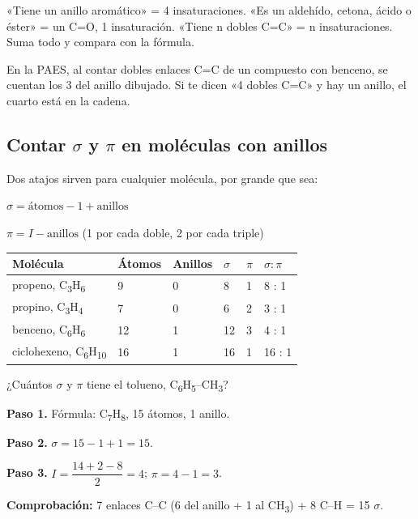 \begin{clave} «Tiene un anillo aromático» = 4 insaturaciones. «Es un aldehído, cetona, ácido o éster» = un C=O, 1 insaturación. «Tiene n dobles C=C» = n insaturaciones. Suma todo y compara con la fórmula.\end{clave}
 
\begin{ojo} En la PAES, al contar dobles enlaces C=C de un compuesto con benceno, se cuentan los 3 del anillo dibujado. Si te dicen «4 dobles C=C» y hay un anillo, el cuarto está en la cadena.\end{ojo}
\subsection{Contar \ensuremath{\sigma} y \ensuremath{\pi} en moléculas con anillos}
Dos atajos sirven para cualquier molécula, por grande que sea:

 
\begin{clave} $\sigma = \text{átomos} - 1 + \text{anillos}$\end{clave}
 
\begin{clave} $\pi = I - \text{anillos}$ (1 por cada doble, 2 por cada triple)\end{clave}
 
\begin{center}\small
\begin{tabular}{@{}llllll@{}}
\toprule
\textbf{Molécula} & \textbf{Átomos} & \textbf{Anillos} & \textbf{$\sigma$} & \textbf{$\pi$} & \textbf{$\sigma : \pi$} \\
\midrule
propeno, C\textsubscript{3}H\textsubscript{6} & 9 & 0 & 8 & 1 & 8 : 1 \\
propino, C\textsubscript{3}H\textsubscript{4} & 7 & 0 & 6 & 2 & 3 : 1 \\
benceno, C\textsubscript{6}H\textsubscript{6} & 12 & 1 & 12 & 3 & 4 : 1 \\
ciclohexeno, C\textsubscript{6}H\textsubscript{10} & 16 & 1 & 16 & 1 & 16 : 1 \\
\bottomrule
\end{tabular}
\end{center}
  
\begin{ejemplo} ¿Cuántos $\sigma$ y $\pi$ tiene el tolueno, C\textsubscript{6}H\textsubscript{5}--CH\textsubscript{3}?\par \textbf{Paso 1.} Fórmula: C\textsubscript{7}H\textsubscript{8}, 15 átomos, 1 anillo.\par \textbf{Paso 2.} $\sigma = 15 - 1 + 1 = 15$.\par \textbf{Paso 3.} $I = \dfrac{14 + 2 - 8}{2} = 4$; $\pi = 4 - 1 = 3$.\par \textbf{Comprobación:} 7 enlaces C--C (6 del anillo + 1 al CH\textsubscript{3}) + 8 C--H = 15 $\sigma$. \end{ejemplo}
 
